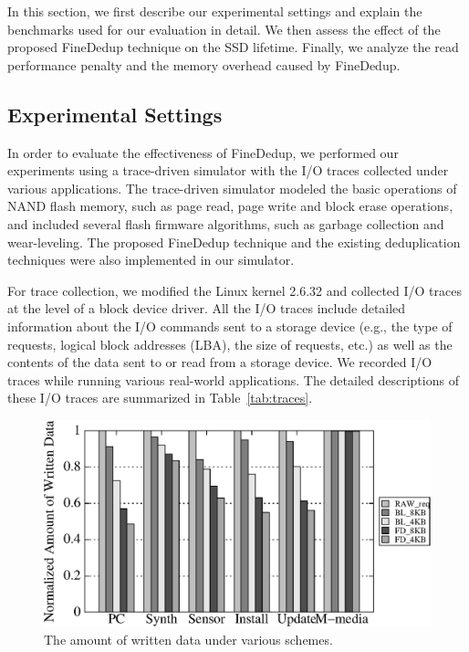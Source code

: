 In this section, 
we first describe our experimental settings and explain the benchmarks used for our evaluation in detail.
We then assess the effect of the proposed FineDedup technique on the SSD lifetime.
Finally, we analyze the read performance penalty and the memory overhead caused by FineDedup.

\subsection{Experimental Settings}

In order to evaluate the effectiveness of FineDedup, 
we performed our experiments using a trace-driven simulator with the I/O traces collected under various applications.
The trace-driven simulator modeled the basic operations of NAND flash memory, 
such as page read, page write and block erase operations,
and included several flash firmware algorithms, 
such as garbage collection and wear-leveling.
The proposed FineDedup technique and the existing deduplication techniques were also implemented in our simulator.

For trace collection, 
we modified the Linux kernel 2.6.32 and collected I/O traces at the level of a block device driver.
All the I/O traces include detailed information about the I/O commands sent to a storage device
(e.g., the type of requests, logical block addresses (LBA), the size of requests, etc.) 
as well as the contents of the data sent to or read from a storage device.
We recorded I/O traces while running various real-world applications.
The detailed descriptions of these I/O traces are summarized in Table~\ref{tab:traces}.

\begin{figure}[t]
	\center
	\includegraphics[scale=0.75]{figure/finededup/dataReduction_Chunksize_less}
	\caption{The amount of written data under various schemes.} %
	\label{fig:reducedData}
\end{figure}

